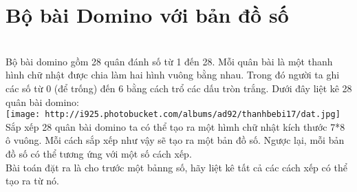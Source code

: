 \section{\textbf{    Bộ bài Domino với bản đồ số   }}


\\   Bộ bài domino gồm 28 quân đánh số từ 1 đến 28. Mỗi quân bài là một thanh hình chữ nhật được chia làm hai hình vuông bằng nhau. Trong đó người ta ghi các số từ 0 (để trống) đến 6 bằng cách trổ các dấu tròn trắng. Dưới đây liệt kê 28 quân bài domino:   
\\
\texttt{[image: http://i925.photobucket.com/albums/ad92/thanhbebi17/dat.jpg]}
\\   Sắp xếp 28 quân bài domino ta có thể tạo ra một hìmh chữ nhật kích thước 7*8 ô vuông. Mỗi cách sắp xếp như vậy sẽ tạo ra một bản đồ số. Ngược lại, mỗi bản đồ số có thể tương ứng với một số cách xếp.   
\\   Bài toán đặt ra là cho trước một bảnng số, hãy liệt kê tất cả các cách xếp có thể tạo ra từ nó.